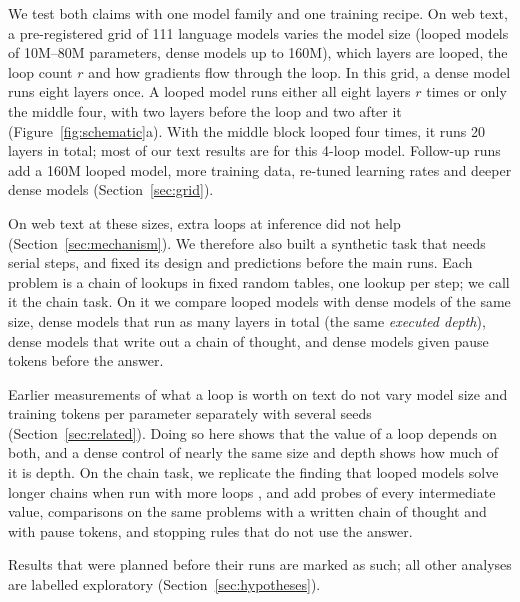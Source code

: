 We test both claims with one model family and one training recipe. On web text, a pre-registered grid of 111 language
models varies the model size (looped models of 10M--80M parameters, dense models up to 160M), which layers are looped,
the loop count $r$ and how gradients flow through the loop. In this grid, a dense model runs eight layers once. A looped
model runs either all eight layers $r$ times or only the middle four, with two layers before the loop and two after it
(Figure~\ref{fig:schematic}a). With the middle block looped four times, it runs 20 layers in total; most of our text
results are for this 4-loop model. Follow-up runs add a 160M looped model, more training data, re-tuned learning rates and deeper dense models
(Section~\ref{sec:grid}).

On web text at these sizes, extra loops at inference did not help (Section~\ref{sec:mechanism}). We therefore also
built a synthetic task that needs serial steps, and fixed its design and predictions before the main runs. Each problem
is a chain of lookups in fixed random tables, one lookup per step; we call it the chain task. On it we compare looped
models with dense models of the same size, dense models that run as many layers in total (the same \emph{executed
depth}), dense models that write out a chain of thought, and dense models given pause tokens before the answer.

Earlier measurements of what a loop is worth on text do not vary model size and training tokens per parameter
separately with several seeds (Section~\ref{sec:related}). Doing so here shows that the value of a loop depends on
both, and a dense control of nearly the same size and depth shows how much of it is depth. On the chain task, we
replicate the finding that looped models solve longer chains when run with more loops
\citep{kohli2026loop,zhang2026recurrence}, and add probes of every intermediate value, comparisons on the same problems
with a written chain of thought and with pause tokens, and stopping rules that do not use the answer.

Results that were planned before their runs are marked as such; all other analyses are labelled exploratory
(Section~\ref{sec:hypotheses}).



